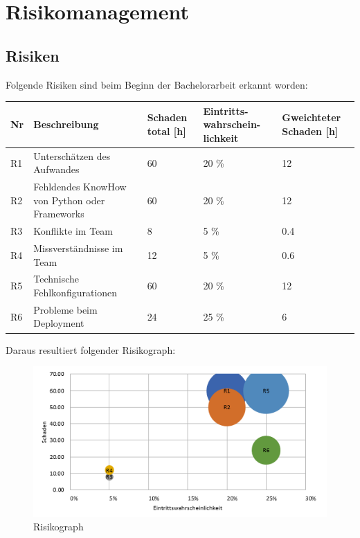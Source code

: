 \section{Risikomanagement}
\subsection{Risiken}
Folgende Risiken sind beim Beginn der Bachelorarbeit erkannt worden:

\begin{table}[h]
	\centering
	\begin{tabu} to 0.9
	\toprule
	Nr & Beschreibung & Schaden total [h] & Eintritts-wahrschein-lichkeit & Gweichteter Schaden [h]\\ 
	\midrule
	R1 & Unterschätzen des Aufwandes & 60 & 20 \% & 12 \\
	R2 & Fehldendes KnowHow von \newline Python oder Frameworks & 60 & 20 \% & 12 \\
	R3 & Konflikte im Team & 8 & 5 \% & 0.4 \\
	R4 & Missverständnisse im Team & 12 & 5 \% & 0.6 \\
	R5 & Technische \newline Fehlkonfigurationen & 60 & 20 \% & 12 \\
	R6 & Probleme beim Deployment & 24 & 25 \% & 6 \\ 
	\bottomrule
	\end{tabu}
\end{table}

\medskip \noindent
Daraus resultiert folgender Risikograph: 
\begin{figure}[H]
	\includegraphics[width=\textwidth,height=\textheight,keepaspectratio]{images/risikoanalyse.png}
	\caption{Risikograph}
\end{figure}

